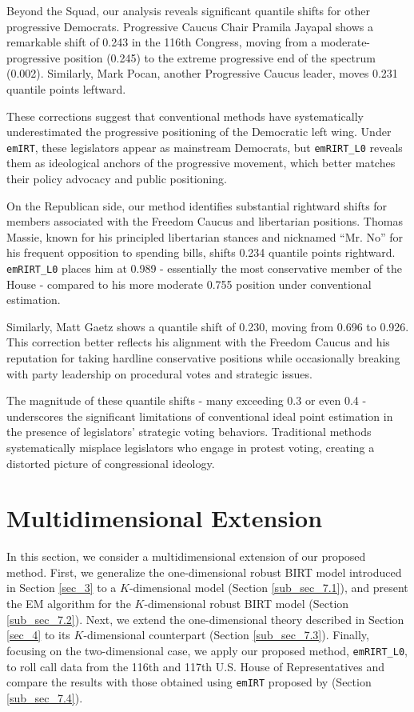 \documentclass[11pt]{article}
\begin{document}
Beyond the Squad, our analysis reveals significant quantile shifts for other progressive Democrats. Progressive Caucus Chair Pramila Jayapal shows a remarkable shift of 0.243 in the 116th Congress, moving from a moderate-progressive position (0.245) to the extreme progressive end of the spectrum (0.002). Similarly, Mark Pocan, another Progressive Caucus leader, moves 0.231 quantile points leftward.

These corrections suggest that conventional methods have systematically underestimated the progressive positioning of the Democratic left wing. Under \texttt{emIRT}, these legislators appear as mainstream Democrats, but \texttt{emRIRT\_L0} reveals them as ideological anchors of the progressive movement, which better matches their policy advocacy and public positioning.

On the Republican side, our method identifies substantial rightward shifts for members associated with the Freedom Caucus and libertarian positions. Thomas Massie, known for his principled libertarian stances and nicknamed ``Mr. No'' for his frequent opposition to spending bills, shifts 0.234 quantile points rightward. \texttt{emRIRT\_L0} places him at 0.989 - essentially the most conservative member of the House - compared to his more moderate 0.755 position under conventional estimation.

Similarly, Matt Gaetz shows a quantile shift of 0.230, moving from 0.696 to 0.926. This correction better reflects his alignment with the Freedom Caucus and his reputation for taking hardline conservative positions while occasionally breaking with party leadership on procedural votes and strategic issues.



The magnitude of these quantile shifts - many exceeding 0.3 or even 0.4 - underscores the significant limitations of conventional ideal point estimation in the presence of legislators' strategic voting behaviors. Traditional methods systematically misplace legislators who engage in protest voting, creating a distorted picture of congressional ideology. 


\section{Multidimensional Extension}\label{sec_7}
In this section, we consider a multidimensional extension of our proposed method. First, we generalize the one-dimensional robust BIRT model introduced in Section \ref{sec_3} to a $ K $-dimensional model (Section \ref{sub_sec_7.1}), and present the EM algorithm for the $K$-dimensional robust BIRT model (Section \ref{sub_sec_7.2}). Next, we extend the one-dimensional theory described in Section \ref{sec_4} to its $ K $-dimensional counterpart (Section \ref{sub_sec_7.3}). Finally, focusing on the two-dimensional case, we apply our proposed method, \texttt{emRIRT\_L0}, to roll call data from the 116th and 117th U.S. House of Representatives and compare the results with those obtained using \texttt{emIRT} proposed by \cite{Imai2016} (Section \ref{sub_sec_7.4}).
\end{document}
